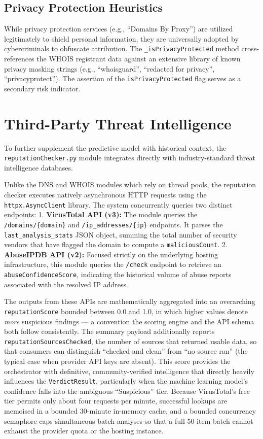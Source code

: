 \subsection{Privacy Protection
Heuristics}\label{privacy-protection-heuristics}

While privacy protection services (e.g., ``Domains By Proxy'') are
utilized legitimately to shield personal information, they are
universally adopted by cybercriminals to obfuscate attribution. The
\texttt{\_isPrivacyProtected} method cross-references the WHOIS
registrant data against an extensive library of known privacy masking
strings (e.g., ``whoisguard'', ``redacted for privacy'',
``privacyprotect''). The assertion of the \texttt{isPrivacyProtected}
flag serves as a secondary risk indicator.

\section{Third-Party Threat
Intelligence}\label{third-party-threat-intelligence}

To further supplement the predictive model with historical context, the
\texttt{reputationChecker.py} module integrates directly with
industry-standard threat intelligence databases.

Unlike the DNS and WHOIS modules which rely on thread pools, the
reputation checker executes natively asynchronous HTTP requests using
the \texttt{httpx.AsyncClient} library. The system concurrently queries
two distinct endpoints: 1. \textbf{VirusTotal API (v3):} The module
queries the \texttt{/domains/\{domain\}} and
\texttt{/ip\_addresses/\{ip\}} endpoints. It parses the
\texttt{last\_analysis\_stats} JSON object, summing the total number of
security vendors that have flagged the domain to compute a
\texttt{maliciousCount}. 2. \textbf{AbuseIPDB API (v2):} Focused
strictly on the underlying hosting infrastructure, this module queries
the \texttt{/check} endpoint to retrieve an
\texttt{abuseConfidenceScore}, indicating the historical volume of abuse
reports associated with the resolved IP address.

The outputs from these APIs are mathematically aggregated into an
overarching \texttt{reputationScore} bounded between 0.0 and 1.0, in
which higher values denote \emph{more} suspicious findings --- a
convention the scoring engine and the API schema both follow
consistently. The summary payload additionally reports
\texttt{reputationSourcesChecked}, the number of sources that returned
usable data, so that consumers can distinguish ``checked and clean''
from ``no source ran'' (the typical case when provider API keys are
absent). This score provides the orchestrator with definitive,
community-verified intelligence that directly heavily influences the
\texttt{VerdictResult}, particularly when the machine learning model's
confidence falls into the ambiguous ``Suspicious'' tier. Because
VirusTotal's free tier permits only about four requests per minute,
successful lookups are memoised in a bounded 30-minute in-memory cache,
and a bounded concurrency semaphore caps simultaneous batch analyses so
that a full 50-item batch cannot exhaust the provider quota or the
hosting instance.



